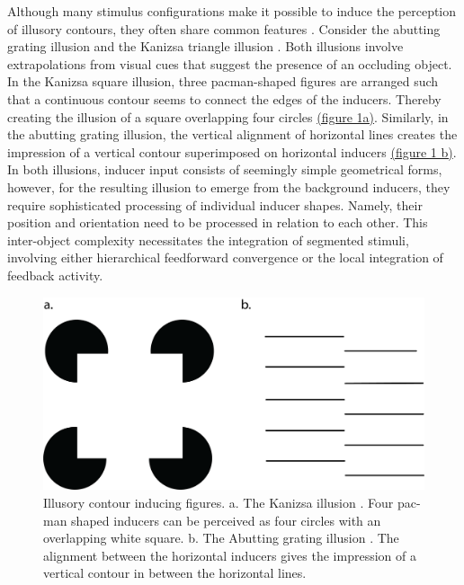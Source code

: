 \documentclass[12pt]{article}
\begin{document}
Although many stimulus configurations make it possible to induce the perception of illusory contours, they often share common features \autocite{palmerLateInfluencesPerceptual2000}. Consider the abutting grating illusion \autocite{sorianoAbuttingGratingIllusion1996} and the Kanizsa triangle illusion \autocite{kanizsaSubjectiveContours1976}. Both illusions involve extrapolations from visual cues that suggest the presence of an occluding object. In the Kanizsa square illusion, three pacman-shaped figures are arranged such that a continuous contour seems to connect the edges of the inducers. Thereby creating the illusion of a square overlapping four circles \hyperref[fig:figure_1]{(figure 1a)}. Similarly, in the abutting grating illusion, the vertical alignment of horizontal lines creates the impression of a vertical contour superimposed on horizontal inducers \hyperref[fig:figure_1]{(figure 1 b)}. In both illusions, inducer input consists of seemingly simple geometrical forms, however, for the resulting illusion to emerge from the background inducers, they require sophisticated processing of individual inducer shapes. Namely, their position and orientation need to be processed in relation to each other. This inter-object complexity necessitates the integration of segmented stimuli, involving either hierarchical feedforward convergence or the local integration of feedback activity. 

\begin{figure}[H]
  \centering
  \includegraphics[width=1.0\textwidth]{adjusted_figures/illusory_figures_kanizsa_grating.png}
  \caption{Illusory contour inducing figures. a. The Kanizsa illusion \autocite{kanizsaSubjectiveContours1976}. Four pac-man shaped inducers can be perceived as four circles with an overlapping white square. b. The Abutting grating illusion \autocite{sorianoAbuttingGratingIllusion1996}. The alignment between the horizontal inducers gives the impression of a vertical contour in between the horizontal lines.}
  \label{fig:figure_1}
\end{figure}
\end{document}
